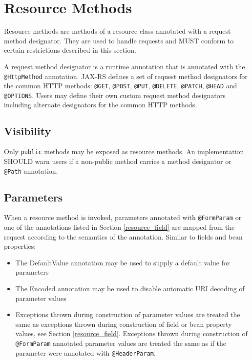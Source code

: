 \section{Resource Methods}
\label{resource_method}

Resource methods are methods of a resource class annotated with a request method designator. They are used to handle
requests and MUST conform to certain restrictions described in this section.

A request method designator is a runtime annotation that is annotated with the \lstinline{@HttpMethod} annotation.
JAX-RS defines a set of request method designators for the common HTTP methods: \lstinline{@GET}, \lstinline{@POST},
\lstinline{@PUT}, \lstinline{@DELETE}, \lstinline{@PATCH}, \lstinline{@HEAD} and \lstinline{@OPTIONS}. Users may define
their own custom request method designators including alternate designators for the common HTTP methods.

\subsection{Visibility}
\label{visibility}

Only \lstinline{public} methods may be exposed as resource methods. An implementation SHOULD warn users if a non-public
method carries a method designator or \lstinline{@Path} annotation.

\subsection{Parameters}
\label{resource_method_params}

When a resource method is invoked, parameters annotated with \lstinline{@FormParam} or one of the annotations listed in
Section \ref{resource_field} are mapped from the request according to the semantics of the annotation. Similar to fields
and bean properties:

\begin{itemize}
    \item The DefaultValue annotation may be used to supply a default value for parameters
    \item The Encoded annotation may be used to disable automatic URI decoding of parameter values
    \item Exceptions thrown during construction of parameter values are treated the same as exceptions thrown during
    construction of field or bean property values, see Section \ref{resource_field}. Exceptions thrown during
    construction of \lstinline{@FormParam} annotated parameter values are treated the same as if the parameter were
    annotated with \lstinline{@HeaderParam}.
\end{itemize}

